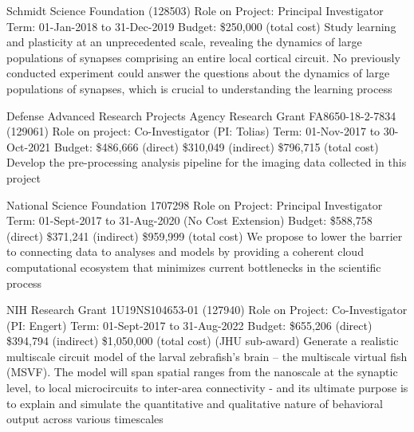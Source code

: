 \documentclass[10pt,colorlinks=true,urlcolor=blue]{moderncv}
\begin{document}
{\newline Schmidt Science Foundation (128503)
\newline Role on Project: Principal Investigator
\newline Term: 01-Jan-2018 to 31-Dec-2019
\newline Budget: \$250,000 (total cost)
\newline Study learning and plasticity at an unprecedented scale, revealing the dynamics of large
populations of synapses comprising an entire local cortical circuit. No previously conducted
experiment could answer the questions about the dynamics of large populations of
synapses, which is crucial to understanding the learning process}{}{}{}{}

{\newline Defense Advanced Research Projects Agency Research Grant FA8650-18-2-7834 (129061)
\newline Role on project: Co-Investigator (PI: Tolias)
\newline Term: 01-Nov-2017 to 30-Oct-2021
\newline Budget: \$486,666 (direct) \$310,049 (indirect) \$796,715 (total cost)
\newline Develop the pre-processing analysis pipeline for the imaging data collected in this project}{}{}{}{}

{\newline National Science Foundation 1707298
\newline Role on Project: Principal Investigator
\newline Term: 01-Sept-2017 to 31-Aug-2020 (No Cost Extension)
\newline Budget: \$588,758 (direct) \$371,241 (indirect) \$959,999 (total cost)
\newline We propose to lower the barrier to connecting data to analyses and models by providing a
coherent cloud computational ecosystem that minimizes current bottlenecks in the scientific
process}{}{}{}{}

{\newline NIH Research Grant 1U19NS104653-01 (127940)
\newline Role on Project: Co-Investigator (PI: Engert)
\newline Term: 01-Sept-2017 to 31-Aug-2022
\newline Budget: \$655,206 (direct) \$394,794 (indirect) \$1,050,000 (total cost) (JHU sub-award)
\newline Generate a realistic multiscale circuit model of the larval zebrafish’s brain – the multiscale
virtual fish (MSVF). The model will span spatial ranges from the nanoscale at the synaptic
level, to local microcircuits to inter-area connectivity - and its ultimate purpose is to explain
and simulate the quantitative and qualitative nature of behavioral output across various
timescales}{}{}{}{}
\end{document}
